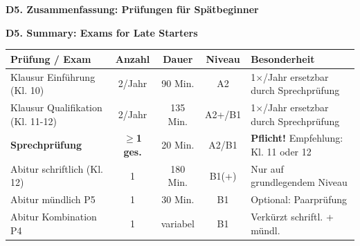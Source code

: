 \documentclass[10pt,a4paper]{article}
\newcommand{\secbil}[2]{%
\vspace{6pt}
\noindent\colorbox{spaet}{\parbox{0.48\textwidth}{\color{white}\bfseries\small #1}}%
\hfill%
\colorbox{english}{\parbox{0.48\textwidth}{\color{white}\bfseries\small #2}}
\vspace{3pt}
}
\begin{document}
\vspace{3mm}

\secbil{D5. Zusammenfassung: Prüfungen für Spätbeginner}{D5. Summary: Exams for Late Starters}

\vspace{2mm}

\begin{center}
\small
\begin{tabular}{|p{2.8cm}|c|c|c|p{4.8cm}|}
\hline
\rowcolor{lightspaet}
\textbf{Prüfung / Exam} & \textbf{Anzahl} & \textbf{Dauer} & \textbf{Niveau} & \textbf{Besonderheit} \\
\hline
Klausur Einführung (Kl. 10) & 2/Jahr & 90 Min. & A2 & 1$\times$/Jahr ersetzbar durch Sprechprüfung \\
\hline
Klausur Qualifikation (Kl. 11-12) & 2/Jahr & 135 Min. & A2+/B1 & 1$\times$/Jahr ersetzbar durch Sprechprüfung \\
\hline
\textbf{Sprechprüfung} & \textbf{$\geq$1 ges.} & 20 Min. & A2/B1 & \textbf{Pflicht!} Empfehlung: Kl. 11 oder 12 \\
\hline
Abitur schriftlich (Kl. 12) & 1 & 180 Min. & B1(+) & Nur auf grundlegendem Niveau \\
\hline
Abitur mündlich P5 & 1 & 30 Min. & B1 & Optional: Paarprüfung \\
\hline
Abitur Kombination P4 & 1 & variabel & B1 & Verkürzt schriftl. + mündl. \\
\hline
\end{tabular}
\end{center}

\vspace{2mm}
\end{document}

